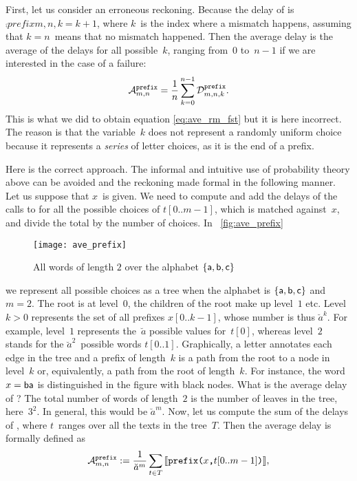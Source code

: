 First, let us consider an erroneous reckoning. Because the delay of
 is \(\comp{prefix}{m,n,k} = k+1\), where \(k\)~is
the index where a mismatch happens, assuming that \({k=n}\)~means that
no mismatch happened. Then the average delay is the average of the
delays for all possible~\(k\), ranging from~\(0\) to~\(n-1\) if we are
interested in the case of a failure:
\[
\ave{prefix}{m,n}
= \frac{1}{n}\sum_{k=0}^{n-1}{\comp{prefix}{m,n,k}}.
\]
This is what we did to obtain equation \eqref{eq:ave_rm_fst}
 but it is here incorrect. The reason is that
the variable~\(k\) does not represent a randomly uniform choice
because it represents a \emph{series} of letter choices, as it is the
end of a prefix.

Here is the correct approach. The informal and intuitive use of
probability theory above can be avoided and the reckoning made formal
in the following manner. Let us suppose that \(x\)~is given. We need
to compute and add the delays of the calls to  for
all the possible choices of \(t[0..m-1]\), which is matched
against~\(x\), and divide the total by the number of choices. In
\fig~\vref{fig:ave_prefix}
\begin{figure}[b]
\centering
\texttt{[image: ave\_prefix]}
\caption{All words of length \(2\) over the alphabet \(\{\word{a},
  \word{b}, \word{c}\}\)
\label{fig:ave_prefix}}
\end{figure}
we represent all possible choices as a tree when the alphabet is
\(\{\word{a}, \word{b}, \word{c}\}\) and~\({m=2}\). The root is at
level~\(0\), the children of the root make up level~\(1\)
etc. Level~\({k>0}\) represents the set of all prefixes \(x[0..k-1]\),
whose number is thus \(\breve{a}^k\). For example, level~\(1\)
represents the~\(\breve{a}\) possible values for~\(t[0]\), whereas
level~\(2\) stands for the \(\breve{a}^2\)~possible words
\(t[0..1]\). Graphically, a letter annotates each edge in the tree and
a prefix of length~\(k\) is a path from the root to a node in
level~\(k\) or, equivalently, a path from the root of
length~\(k\). For instance, the word \(x=\word{ba}\) is distinguished
in the figure with black nodes. What is the average delay of
? The total number of words of length~\(2\) is the
number of leaves in the tree, here~\(3^2\). In general, this would be
\(\breve{a}^m\). Now, let us compute the sum of the delays of
, where \(t\)~ranges over all the texts
in the tree~\(T\). Then the average delay is formally defined as
\[
\ave{prefix}{m,n} := \frac{1}{\breve{a}^m}
                    \sum_{t \in T}{\delay{prefix(\(x\),\(t[0..m-1]\))}},
\]
